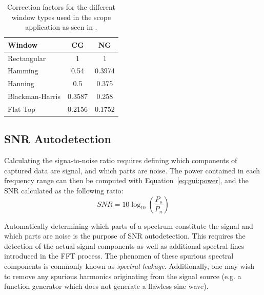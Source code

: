 \begin{table}
    \centering
    \caption[Window Correction Factors]{%
        Correction factors  for the different  window types used in  the scope
        application as seen in \cite{gui:hanspi}.%
    }
    \label{tab:gui:corrfactors}
    \begin{tabular}{lSS}
        \toprule
        Window          & {CG}   & {NG}\\
        \midrule
        Rectangular     & 1      & 1\\
        Hamming         & 0.54   & 0.3974\\
        Hanning         & 0.5    & 0.375\\
        Blackman-Harris & 0.3587 & 0.258\\
        Flat Top        & 0.2156 & 0.1752\\
        \bottomrule
    \end{tabular}
\end{table}


%
%
\subsection{SNR Autodetection} %
\label{subsec:gui:snr_autodetection}

Calculating  the signa-to-noise  ratio requires  defining which  components of
captured data  are signal, and which  parts are noise. The power  contained in
each frequency  range can  then be computed  with Equation~\ref{eq:gui:power},
and the SNR calculated as the following ratio:
\begin{equation}
    SNR = 10\log_{10}(\frac{P_s}{P_n})
    \label{eq:gui:snr}
\end{equation}

Automatically determining which parts of  a spectrum constitute the signal and
which parts are  noise is the purpose of SNR  autodetection. This requires the
detection of the actual signal components as well as additional spectral lines
introduced  in  the  FFT  process. The phenomen  of  these  spurious  spectral
components is commonly known as \emph{spectral leakage}. Additionally, one may
wish to remove any spurious harmonics originating from the signal source (e.g.
a function generator which does not generate a flawless sine wave).

